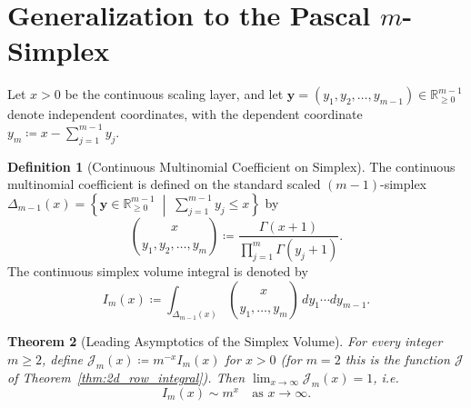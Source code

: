 \documentclass[11pt,a4paper]{article}
\theoremstyle{plain}
\newtheorem{theorem}{Theorem}[section]
\theoremstyle{definition}
\newtheorem{definition}[theorem]{Definition}
\theoremstyle{remark}
\numberwithin{equation}{section}
\begin{document}
\section{Generalization to the Pascal \texorpdfstring{$m$}{m}-Simplex}

Let $x > 0$ be the continuous scaling layer, and let $\mathbf{y} = (y_1, y_2, \dots, y_{m-1}) \in \mathbb{R}_{\ge 0}^{m-1}$ denote independent coordinates, with the dependent coordinate $y_m \coloneqq x - \sum_{j=1}^{m-1} y_j$.

\begin{definition}[Continuous Multinomial Coefficient on Simplex]
The continuous multinomial coefficient is defined on the standard scaled $(m-1)$-simplex $\Delta_{m-1}(x) = \left\{\mathbf{y} \in \mathbb{R}_{\ge 0}^{m-1} \;\middle|\; \sum_{j=1}^{m-1} y_j \le x\right\}$ by
\begin{equation}
\binom{x}{y_1, y_2, \dots, y_m} \coloneqq \frac{\Gamma(x+1)}{\prod_{j=1}^m \Gamma(y_j+1)}.
\end{equation}
The continuous simplex volume integral is denoted by
\begin{equation}
I_m(x) \coloneqq \int_{\Delta_{m-1}(x)} \binom{x}{y_1, \dots, y_m} \, dy_1 \cdots dy_{m-1}.
\end{equation}
\end{definition}

\begin{theorem}[Leading Asymptotics of the Simplex Volume]
\label{thm:simplex_integral}
For every integer $m \ge 2$, define $\mathcal{J}_m(x) \coloneqq m^{-x} I_m(x)$ for $x > 0$ (for $m = 2$ this is the function $\mathcal{J}$ of Theorem~\ref{thm:2d_row_integral}). Then $\lim_{x\to\infty}\mathcal{J}_m(x) = 1$, i.e.
\begin{equation}
I_m(x) \sim m^x \quad \text{as } x \to \infty.
\end{equation}
\end{theorem}
\end{document}
